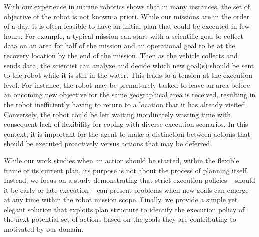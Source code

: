 With our experience in marine robotics shows that in many instances,
the set of objective of the robot is not known a priori. While our
missions are in the order of a day, it is often feasible to have an
initial plan that could be executed in few hours. For example, a
typical mission can start with a scientific goal to collect data on an
area for half of the mission and an operational goal to be at the
recovery location by the end of the mission. Then as the vehicle
collects and sends data, the scientist can analyze and decide which
new goal(s) should be sent to the robot while it is still in the
water. This leads to a tension at the execution level.  For instance,
the robot may be prematurely tasked to leave an area before an
oncoming new objective for the same geographical area is received,
resulting in the robot inefficiently having to return to a location
that it has already visited. Conversely, the robot could be left
waiting inordinately wasting time with consequent lack of flexibility
for coping with diverse execution scenarios. In this context, it is
important for the agent to make a distinction between actions that
should be executed proactively versus actions that may be deferred.

While our work studies when an action should be started, within the
flexible frame of its current plan, its purpose is not about the
process of planning itself. Instead, we focus on a study demonstrating
that strict execution policies -- should it be early or late execution
-- can present problems when new goals can emerge at any time within
the robot mission scope. Finally, we provide a simple yet elegant
solution that exploits plan structure to identify the execution policy
of the next potential set of actions based on the goals they are
contributing to motivated by our domain.



